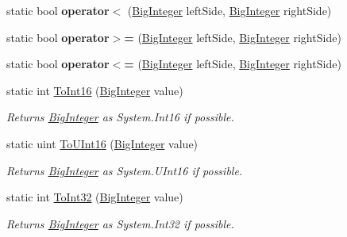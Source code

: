 \begin{DoxyCompactItemize}
\mbox{\label{class_scott_garland_1_1_big_integer_aff57d146e2a3e57c5a291b45bbb25636}} 
static bool {\bfseries operator$<$} (\hyperlink{class_scott_garland_1_1_big_integer}{Big\+Integer} left\+Side, \hyperlink{class_scott_garland_1_1_big_integer}{Big\+Integer} right\+Side)
\item 
\mbox{\label{class_scott_garland_1_1_big_integer_ab8fca82975dcac550a798d63ee147133}} 
static bool {\bfseries operator$>$=} (\hyperlink{class_scott_garland_1_1_big_integer}{Big\+Integer} left\+Side, \hyperlink{class_scott_garland_1_1_big_integer}{Big\+Integer} right\+Side)
\item 
\mbox{\label{class_scott_garland_1_1_big_integer_aeed3d904b36d585e151be95cd12e798a}} 
static bool {\bfseries operator$<$=} (\hyperlink{class_scott_garland_1_1_big_integer}{Big\+Integer} left\+Side, \hyperlink{class_scott_garland_1_1_big_integer}{Big\+Integer} right\+Side)
\item 
static int \hyperlink{class_scott_garland_1_1_big_integer_a282c756614e3530c7ca3db75122df382}{To\+Int16} (\hyperlink{class_scott_garland_1_1_big_integer}{Big\+Integer} value)
\begin{DoxyCompactList}\small\item\em Returns \hyperlink{class_scott_garland_1_1_big_integer}{Big\+Integer} as System.\+Int16 if possible. \end{DoxyCompactList}\item 
static uint \hyperlink{class_scott_garland_1_1_big_integer_a2a619b20c5463022dd1f6d21b3816a22}{To\+U\+Int16} (\hyperlink{class_scott_garland_1_1_big_integer}{Big\+Integer} value)
\begin{DoxyCompactList}\small\item\em Returns \hyperlink{class_scott_garland_1_1_big_integer}{Big\+Integer} as System.\+U\+Int16 if possible. \end{DoxyCompactList}\item 
static int \hyperlink{class_scott_garland_1_1_big_integer_ae3db4ced22f3c869e6093fe0dc3f7b73}{To\+Int32} (\hyperlink{class_scott_garland_1_1_big_integer}{Big\+Integer} value)
\begin{DoxyCompactList}\small\item\em Returns \hyperlink{class_scott_garland_1_1_big_integer}{Big\+Integer} as System.\+Int32 if possible. \end{DoxyCompactList}\item 

\end{DoxyCompactItemize}
